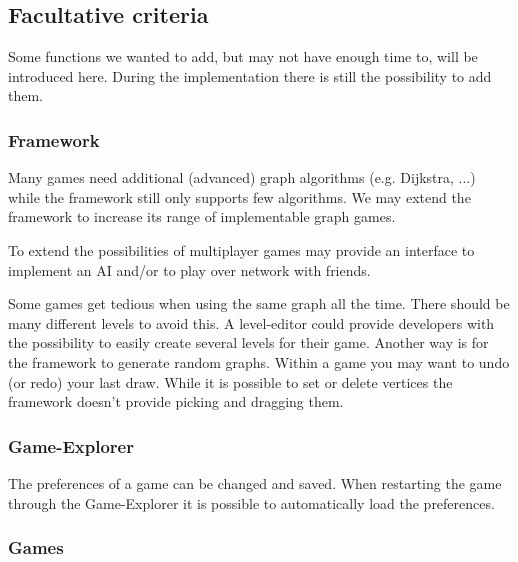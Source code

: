 \subsection{Facultative criteria}
\label{facultative-criteria}
Some functions we wanted to add, but may not have enough time to, will be introduced here. During the implementation there is still the possibility to add them.

\subsubsection{Framework}
Many \glspl{game} need additional (advanced) \gls{graph} \glspl{algorithm} (e.g. Dijkstra, ...)	while the \gls{framework} still only supports few algorithms. We may extend the framework to increase its range of implementable graph games. \par
To extend the possibilities of multiplayer games {\graphioli} may provide an interface to implement an \gls{AI} and/or to play over network with friends. \par
Some games get tedious when using the same graph all the time. There should be many different \glspl{level} to avoid this. A \gls{level-editor} could provide \glspl{developer} with the possibility to easily create several levels for their game. Another way is for the framework to generate random graphs.
Within a game you may want to \gls{undo} (or \gls{redo}) your last draw.
While it is possible to set or delete vertices the framework doesn't provide picking and dragging them.

\subsubsection{Game-Explorer}
The preferences of a game can be changed and saved. When restarting the game through the Game-Explorer it is possible to automatically load the preferences. \\

\subsubsection{Games}
